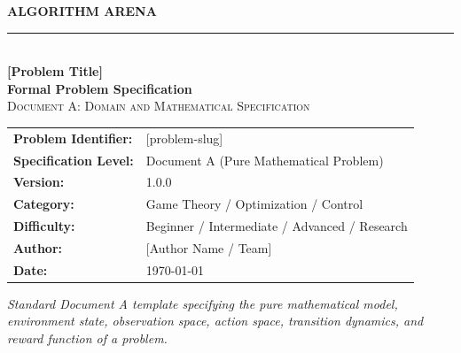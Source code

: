 \documentclass[11pt,a4paper]{article}
\newcommand{\problemname}{[Problem Title]}
\newcommand{\shortname}{[problem-slug]}
\newcommand{\problemversion}{1.0.0}
\newcommand{\problemauthor}{[Author Name / Team]}
\newcommand{\problemdate}{\today}
\begin{document}
\hypersetup{pageanchor=false}
\begin{titlepage}

    \centering
    \vspace*{1.0cm}

    {\Large\textbf{\color{arenaBlue}ALGORITHM ARENA}}\\[0.4cm]
    {\color{codegray!60}\rule{0.5\textwidth}{0.8pt}}\\[1.2cm]

    {\fontsize{26}{34}\selectfont\textbf{\problemname}}\\[0.4cm]
    {\Large\color{arenaBlue}\textbf{Formal Problem Specification}}\\[1.2cm]

    {\large\textsc{Document A: Domain and Mathematical Specification}}\\[1.5cm]

    \begin{tabular}{ll}
        \toprule
        \textbf{Problem Identifier:} & \shortname \\
        \textbf{Specification Level:}& Document A (Pure Mathematical Problem) \\
        \textbf{Version:}            & \problemversion \\
        \textbf{Category:}           & Game Theory / Optimization / Control \\
        \textbf{Difficulty:}         & Beginner / Intermediate / Advanced / Research \\
        \textbf{Author:}             & \problemauthor \\
        \textbf{Date:}               & \problemdate \\
        \bottomrule
    \end{tabular}

    \vfill

    \parbox{0.85\textwidth}{
        \centering\textit{
            Standard Document A template specifying the pure mathematical model,
            environment state, observation space, action space, transition dynamics,
            and reward function of a problem.
        }
    }

\end{titlepage}
\hypersetup{pageanchor=true}

\tableofcontents
\newpage
{}
\end{document}
